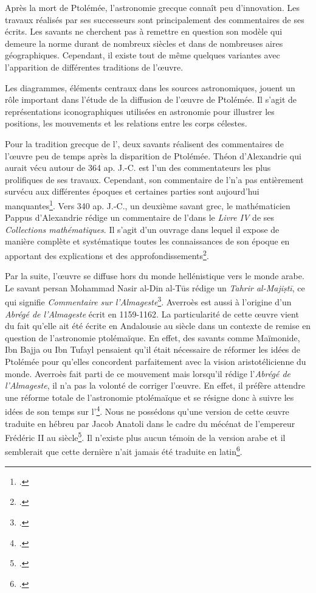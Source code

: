 Après la mort de Ptolémée, l'astronomie grecque connaît peu d'innovation. Les travaux réalisés par ses successeurs sont principalement des commentaires de ses écrits. Les savants ne cherchent pas à remettre en question son modèle qui demeure la norme durant de nombreux siècles et dans de nombreuses aires géographiques. Cependant, il existe tout de même quelques variantes avec l'apparition de différentes traditions de l'œuvre.

Les diagrammes, éléments centraux dans les sources astronomiques, jouent un rôle important dans l'étude de la diffusion de l'œuvre de Ptolémée. Il s'agit de représentations iconographiques utilisées en astronomie pour illustrer les positions, les mouvements et les relations entre les corps célestes.

Pour la tradition grecque de l'\almageste, deux savants réalisent des commentaires de l'œuvre peu de temps après la disparition de Ptolémée.
Théon d'Alexandrie qui aurait vécu autour de 364 ap. J.-C. est l'un des commentateurs les plus prolifiques de ses travaux. Cependant, son commentaire de l'\almageste n'a pas entièrement survécu aux différentes époques et certaines parties sont aujourd'hui manquantes\footcite{tihonLivreRetrouveCommentaire1987}. Vers 340 ap. J.-C., un deuxième savant grec, le mathématicien Pappus d'Alexandrie rédige un commentaire de l'\almageste dans le \textit{Livre IV} de ses \textit{Collections mathématiques}. Il s'agit d'un ouvrage dans lequel il expose de manière complète et systématique toutes les connaissances de son époque en apportant des explications et des approfondissements\footcite{meyerPappus}. 

Par la suite, l'œuvre se diffuse hors du monde hellénistique vers le monde arabe. Le savant persan Mohammad Nasir al-Din al-Tūs rédige un \textit{Tahrir al-Majiṣtī}, ce qui signifie \textit{Commentaire sur l'Almageste}\footcite{servicesredactionnelsdelencyclopaediauniversalisMohammadNasirAlDin}. 
Averroès est aussi à l'origine d'un \textit{Abrégé de l'Almageste} écrit en 1159-1162. La particularité de cette œuvre vient du fait qu'elle ait été écrite en Andalousie au \XII siècle dans un contexte de remise en question de l'astronomie ptolémaïque. En effet, des savants comme Maïmonide, Ibn Bajja ou Ibn Tufayl pensaient qu'il était nécessaire de réformer les idées de Ptolémée pour qu'elles concordent parfaitement avec la vision aristotélicienne du monde. Averroès fait parti de ce mouvement mais lorsqu'il rédige l'\textit{Abrégé de l'Almageste}, il n'a pas la volonté de corriger l'œuvre. En effet, il préfère attendre une réforme totale de l'astronomie ptolémaïque et se résigne donc à suivre les idées de son temps sur l'\almageste\footcite{layAverroesAbregeDastronomie1998}. Nous ne possédons qu'une version de cette œuvre traduite en hébreu par Jacob Anatoli dans le cadre du mécénat de l'empereur Frédéric II au \XIII siècle\footcite{layLabregeLAlmagesteAttribue1990}. Il n'existe plus aucun témoin de la version arabe et il semblerait que cette dernière n'ait jamais été traduite en latin\footcite{layAverroesHebraicusInedit2005}.

